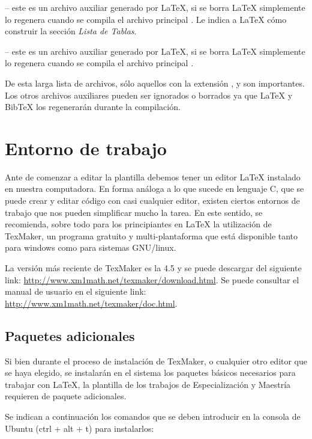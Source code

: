  -- este es un archivo auxiliar generado por \LaTeX{}, si se borra \LaTeX{} simplemente lo regenera cuando se compila el archivo principal .  Le indica a \LaTeX{} cómo construir la sección \emph{Lista de Tablas}.

 -- este es un archivo auxiliar generado por \LaTeX{}, si se borra \LaTeX{} simplemente lo regenera cuando se compila el archivo principal .

De esta larga lista de archivos, sólo aquellos con la extensión ,  y  son importantes.  Los otros archivos auxiliares pueden ser ignorados o borrados ya que \LaTeX{} y BibTeX los regenerarán durante la compilación.


\section{Entorno de trabajo}

Ante de comenzar a editar la plantilla debemos tener un editor \LaTeX{} instalado en nuestra computadora.  En forma análoga a lo que sucede en lenguaje C, que se puede crear y editar código con casi cualquier editor, existen ciertos entornos de trabajo que nos pueden simplificar mucho la tarea.  En este sentido, se recomienda, sobre todo para los principiantes en \LaTeX{} la utilización de TexMaker, un programa gratuito y multi-plantaforma que está disponible tanto para windows como para sistemas GNU/linux.

La versión más reciente de TexMaker es la 4.5 y se puede descargar del siguiente link: \url{http://www.xm1math.net/texmaker/download.html}. Se puede consultar el manual de usuario en el siguiente link: \url{http://www.xm1math.net/texmaker/doc.html}.
 

\subsection{Paquetes adicionales}

Si bien durante el proceso de instalación de TexMaker, o cualquier otro editor que se haya elegido, se instalarán en el sistema los paquetes básicos necesarios para trabajar con \LaTeX{}, la plantilla de los trabajos de Especialización y Maestría requieren de paquete adicionales.

Se indican a continuación los comandos que se deben introducir en la consola de Ubuntu (ctrl + alt + t) para instalarlos:

